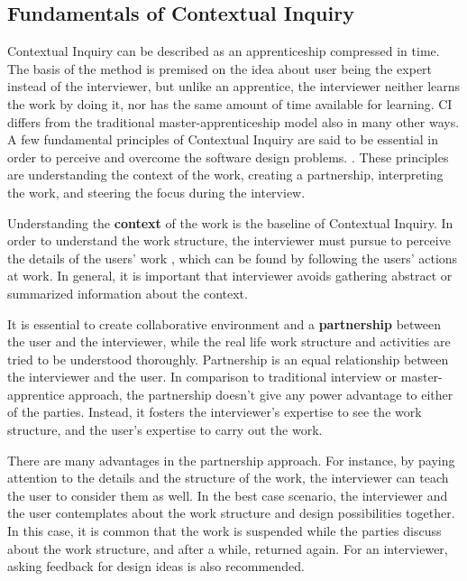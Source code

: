 \documentclass[12pt,a4paper,oneside,pdftex]{report}
\begin{document}
\subsection{Fundamentals of Contextual Inquiry}
Contextual Inquiry can be described as an apprenticeship compressed in time. The basis of the method is premised on the idea about user being the expert instead of the interviewer, but unlike an apprentice, the interviewer neither learns the work by doing it, nor has the same amount of time available for learning. \citep{RefWorks:21} CI differs from the traditional master-apprenticeship model also in many other ways. A few fundamental principles of Contextual Inquiry are said to be essential in order to perceive and overcome the software design problems. \citep{RefWorks:21}. These principles are understanding the context of the work, creating a partnership, interpreting the work, and steering the focus during the interview. \citep{RefWorks:21, RefWorks:28}

Understanding the \textbf{context} of the work is the baseline of Contextual Inquiry. In order to understand the work structure, the interviewer must pursue to perceive the details of the users' work , which can be found by following the users' actions at work. In general, it is important that interviewer avoids gathering abstract or summarized information about the context.\citep{RefWorks:21}

It is essential to create collaborative environment and a \textbf{partnership} between the user and the interviewer, while the real life work structure and activities are tried to be understood thoroughly. Partnership is an equal relationship between the interviewer and the user. In comparison to traditional interview or master-apprentice approach, the partnership doesn't give any power advantage to either of the parties. Instead, it fosters the interviewer's expertise to see the work structure, and the user's expertise to carry out the work. 
\citep{RefWorks:21}

There are many advantages in the partnership approach. For instance, by paying attention to the details and the structure of the work, the interviewer can teach the user to consider them as well. In the best case scenario, the interviewer and the user contemplates about the work structure and design possibilities together. In this case, it is common that the work is suspended while the parties discuss about the work structure, and after a while, returned again. For an interviewer, asking feedback for design ideas is also recommended.\citep{RefWorks:21}
\end{document}
